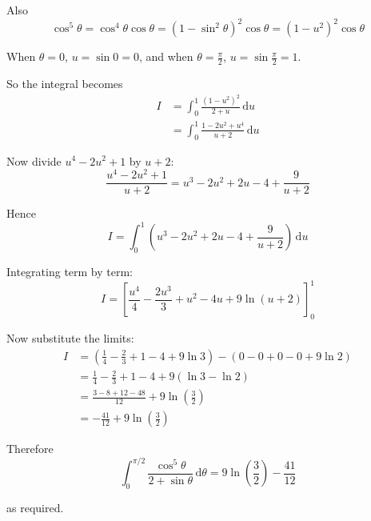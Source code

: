 \documentclass[leqno]{article}
\begin{document}
\begin{enumerate}[
  label=\textbf{\arabic*.},
  leftmargin=*,
  topsep=0pt,
  partopsep=0pt,
  parsep=0pt
]
\begin{djsSolution}
Also
\[
\cos^5\theta=\cos^4\theta\cos\theta=(1-\sin^2\theta)^2\cos\theta=(1-u^2)^2\cos\theta
\]

When $\theta=0$, $u=\sin 0=0$, and when $\theta=\frac{\pi}{2}$, $u=\sin\frac{\pi}{2}=1$.

So the integral becomes
\begin{align*}
I&=\int_0^1 \frac{(1-u^2)^2}{2+u}\,\mathrm{d}u \\
&=\int_0^1 \frac{1-2u^2+u^4}{u+2}\,\mathrm{d}u
\end{align*}

Now divide $u^4-2u^2+1$ by $u+2$:
\[
\frac{u^4-2u^2+1}{u+2}=u^3-2u^2+2u-4+\frac{9}{u+2}
\]

Hence
\[
I=\int_0^1\left(u^3-2u^2+2u-4+\frac{9}{u+2}\right)\,\mathrm{d}u
\]

Integrating term by term:
\[
I=\left[\frac{u^4}{4}-\frac{2u^3}{3}+u^2-4u+9\ln(u+2)\right]_0^1
\]

Now substitute the limits:
\begin{align*}
I&=\left(\frac{1}{4}-\frac{2}{3}+1-4+9\ln 3\right)-\left(0-0+0-0+9\ln 2\right) \\
&=\frac{1}{4}-\frac{2}{3}+1-4+9(\ln 3-\ln 2) \\
&=\frac{3-8+12-48}{12}+9\ln\left(\frac{3}{2}\right) \\
&=-\frac{41}{12}+9\ln\left(\frac{3}{2}\right)
\end{align*}

Therefore
\[
\int_0^{\pi/2} \frac{\cos^5 \theta}{2 + \sin \theta}\,\mathrm{d}\theta
= 9\ln\left(\frac{3}{2}\right)-\frac{41}{12}
\]

as required.
\end{djsSolution}


\end{enumerate}
\end{document}
